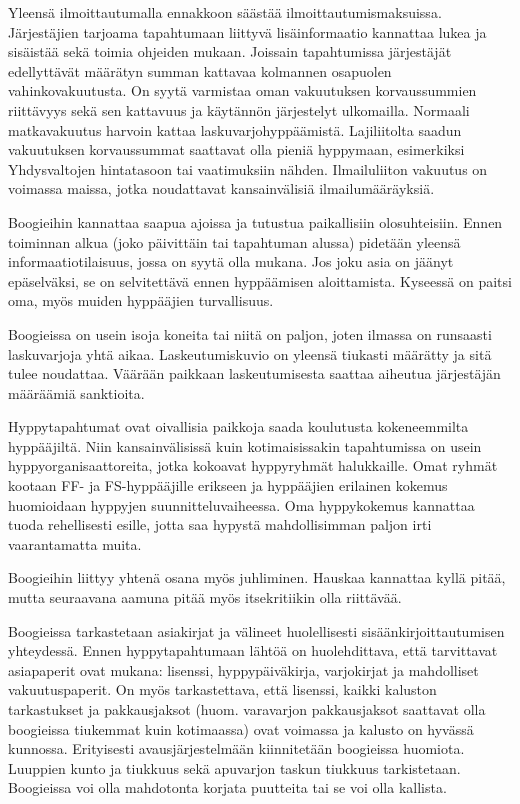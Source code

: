 Yleensä ilmoittautumalla ennakkoon säästää ilmoittautumismaksuissa. Järjestäjien tarjoama tapahtumaan liittyvä lisäinformaatio kannattaa lukea ja sisäistää sekä toimia ohjeiden mukaan. Joissain tapahtumissa järjestäjät edellyttävät määrätyn summan kattavaa kolmannen osapuolen vahinkovakuutusta. On syytä varmistaa oman vakuutuksen korvaussummien riittävyys sekä sen kattavuus ja käytännön järjestelyt ulkomailla. Normaali matkavakuutus harvoin kattaa laskuvarjohyppäämistä. Lajiliitolta saadun vakuutuksen korvaussummat saattavat olla pieniä hyppymaan, esimerkiksi Yhdysvaltojen hintatasoon tai vaatimuksiin nähden. Ilmailuliiton vakuutus on voimassa maissa, jotka noudattavat kansainvälisiä ilmailumääräyksiä. 


Boogieihin kannattaa saapua ajoissa ja tutustua paikallisiin olosuhteisiin. Ennen toiminnan alkua (joko päivittäin tai tapahtuman alussa) pidetään yleensä informaatiotilaisuus, jossa on syytä olla mukana. Jos joku asia on jäänyt epäselväksi, se on selvitettävä ennen hyppäämisen aloittamista. Kyseessä on paitsi oma, myös muiden hyppääjien turvallisuus. 


Boogieissa on usein isoja koneita tai niitä on paljon, joten ilmassa on runsaasti laskuvarjoja yhtä aikaa. Laskeutumiskuvio on yleensä tiukasti määrätty ja sitä tulee noudattaa. Väärään paikkaan laskeutumisesta saattaa aiheutua järjestäjän määräämiä sanktioita. 


Hyppytapahtumat ovat oivallisia paikkoja saada koulutusta kokeneemmilta hyppääjiltä. Niin kansainvälisissä kuin kotimaisissakin tapahtumissa on usein hyppyorganisaattoreita, jotka kokoavat hyppyryhmät halukkaille. Omat ryhmät kootaan FF- ja FS-hyppääjille erikseen ja hyppääjien erilainen kokemus huomioidaan hyppyjen suunnitteluvaiheessa. Oma hyppykokemus kannattaa tuoda rehellisesti esille, jotta saa hypystä mahdollisimman paljon irti vaarantamatta muita.  


Boogieihin liittyy yhtenä osana myös juhliminen. Hauskaa kannattaa kyllä pitää, mutta seuraavana aamuna pitää myös itsekritiikin olla riittävää. 


Boogieissa tarkastetaan asiakirjat ja välineet huolellisesti sisäänkirjoittautumisen yhteydessä. Ennen hyppytapahtumaan lähtöä on huolehdittava, että tarvittavat asiapaperit ovat mukana: lisenssi, hyppypäiväkirja, varjokirjat ja mahdolliset vakuutuspaperit. On myös tarkastettava, että lisenssi, kaikki kaluston tarkastukset ja pakkausjaksot (huom. varavarjon pakkausjaksot saattavat olla boogieissa tiukemmat kuin kotimaassa) ovat voimassa ja kalusto on hyvässä kunnossa. Erityisesti avausjärjestelmään kiinnitetään boogieissa huomiota. Luuppien kunto ja tiukkuus sekä apuvarjon taskun tiukkuus tarkistetaan. Boogieissa voi olla mahdotonta korjata puutteita tai se voi olla kallista. 

